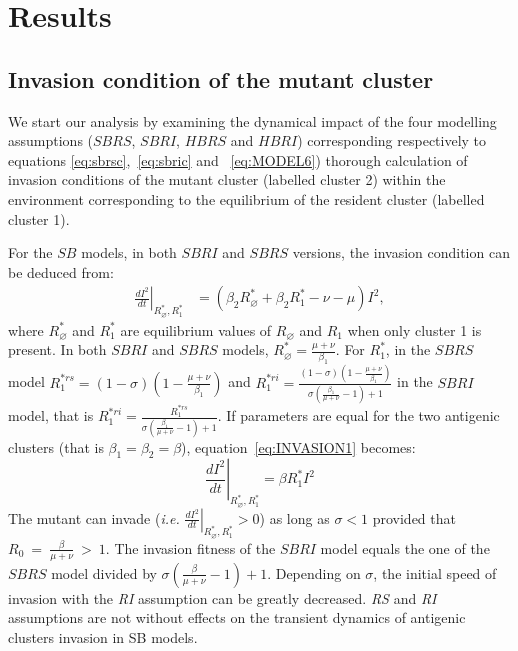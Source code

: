 \section{Results}

\subsection{Invasion condition of the mutant cluster}

We start our analysis by examining the dynamical impact of the four
modelling assumptions ($SBRS$, $SBRI$, $HBRS$ and $HBRI$)
corresponding respectively to equations
\eqref{eq:sbrsc},~\eqref{eq:sbric} and ~\eqref{eq:MODEL6}) thorough
calculation of invasion conditions of the mutant cluster (labelled
cluster 2) within the environment corresponding to the equilibrium of
the resident cluster (labelled cluster 1).

For the $SB$ models, in both $SBRI$ and $SBRS$ versions, the invasion
condition can be deduced from:
\begin{align}
  \left. \frac{d I^2}{d t} \right|_{R_\varnothing^*, R_1^*} & =
  (\beta_2 R_\varnothing^* + \beta_2 R_1^* -\nu -\mu)
  I^2, \label{eq:INVASION1}
\end{align}
where $R_\varnothing^*$ and $R_1^*$ are equilibrium values of
$R_\varnothing$ and $R_1$ when only cluster 1 is present. In both
$SBRI$ and $SBRS$ models, $R_\varnothing^* = \frac{\mu +
  \nu}{\beta_1}$. For $R_1^*$, in the $SBRS$ model $R_1^{*rs} = (1 -
\sigma) \left(1 - \frac{\mu + \nu}{\beta_1} \right)$ and $R_1^{*ri} =
\frac{(1 - \sigma) \left(1 - \frac{\mu + \nu}{\beta_1} \right)}{\sigma
  \left( \frac{\beta_1}{\mu + \nu} -1 \right) +1}$ in the $SBRI$
model, that is $R_1^{*ri} = \frac{R_1^{*rs}}{\sigma \left(
    \frac{\beta_1}{\mu + \nu} -1 \right) +1} $. If parameters are
equal for the two antigenic clusters (that is
$\beta_1=\beta_2=\beta$), equation~\eqref{eq:INVASION1} becomes:
$$\left. \frac{d I^2}{d t} \right|_{R_\varnothing^*, R_1^{*}}  = \beta R_1^{*} I^2 $$
The mutant can invade (\textit{i.e.} $\left. \frac{d I^2}{d t}
\right|_{R_\varnothing^*, R_1^*} > 0$) as long as $\sigma < 1$
provided that $R_0~=~\frac{\beta}{\mu + \nu}~>~1$. The invasion
fitness of the $SBRI$ model equals the one of the $SBRS$ model divided
by $\sigma \left( \frac{\beta}{\mu + \nu} -1 \right) +1$. Depending on
$\sigma$, the initial speed of invasion with the \textit{RI}
assumption can be greatly decreased. \textit{RS} and \textit{RI}
assumptions are not without effects on the transient dynamics of
antigenic clusters invasion in SB models.

